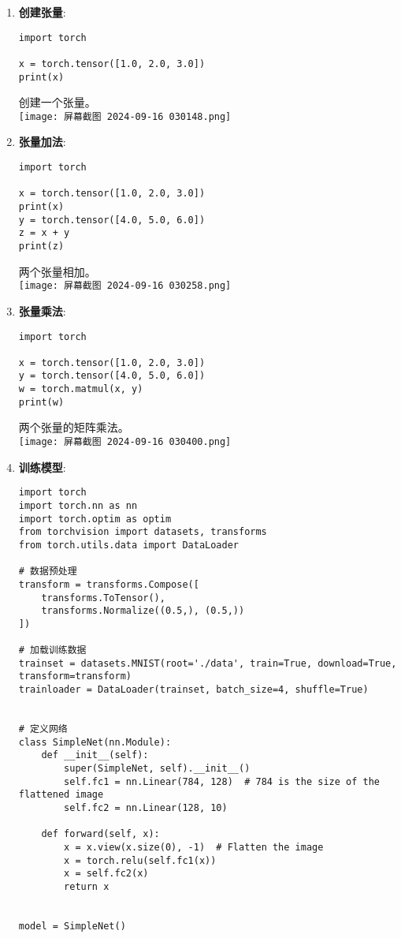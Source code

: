 \documentclass{ctexart}
\begin{document}
\begin{enumerate}[label=\arabic*.]
\item \textbf{创建张量}:
\begin{lstlisting}
import torch

x = torch.tensor([1.0, 2.0, 3.0])
print(x)
\end{lstlisting}
创建一个张量。\\
\texttt{[image: 屏幕截图 2024-09-16 030148.png]}
\item \textbf{张量加法}:
\begin{lstlisting}
import torch

x = torch.tensor([1.0, 2.0, 3.0])
print(x)
y = torch.tensor([4.0, 5.0, 6.0])
z = x + y
print(z)
\end{lstlisting}
两个张量相加。\\
\texttt{[image: 屏幕截图 2024-09-16 030258.png]}
\item \textbf{张量乘法}:
\begin{lstlisting}
import torch

x = torch.tensor([1.0, 2.0, 3.0])
y = torch.tensor([4.0, 5.0, 6.0])
w = torch.matmul(x, y)
print(w)

\end{lstlisting}
两个张量的矩阵乘法。\\
\texttt{[image: 屏幕截图 2024-09-16 030400.png]}
\item \textbf{训练模型}:
\begin{lstlisting}
import torch
import torch.nn as nn
import torch.optim as optim
from torchvision import datasets, transforms
from torch.utils.data import DataLoader

# 数据预处理
transform = transforms.Compose([
    transforms.ToTensor(),
    transforms.Normalize((0.5,), (0.5,))
])

# 加载训练数据
trainset = datasets.MNIST(root='./data', train=True, download=True, transform=transform)
trainloader = DataLoader(trainset, batch_size=4, shuffle=True)


# 定义网络
class SimpleNet(nn.Module):
    def __init__(self):
        super(SimpleNet, self).__init__()
        self.fc1 = nn.Linear(784, 128)  # 784 is the size of the flattened image
        self.fc2 = nn.Linear(128, 10)

    def forward(self, x):
        x = x.view(x.size(0), -1)  # Flatten the image
        x = torch.relu(self.fc1(x))
        x = self.fc2(x)
        return x


model = SimpleNet()


\end{lstlisting}
\end{enumerate}
\end{document}

